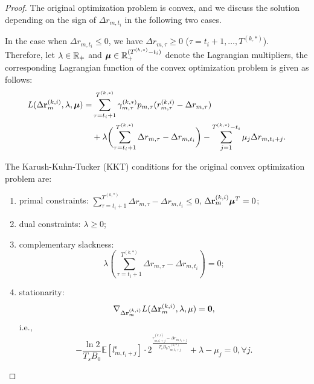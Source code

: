 \begin{proof}
    The original optimization problem is convex, and we discuss the solution depending on the sign of $\Delta{r}_{m,t_i}$ in the following two cases.

    In the case when $\Delta{r}_{m,t_i} \leq 0$, we have $\Delta{r}_{m,\tau} \geq 0$ ($\tau=t_i+1, \dots, T^{(k,*)}$).
    Therefore, let $\lambda \in \mathbb{R}_+$ and $\boldsymbol{\mu} \in \mathbb{R}^{(T^{(k,*)}-t_i)}_+$ denote the Lagrangian multipliers, the corresponding Lagrangian function of the convex optimization problem is given as follows:
    \begin{align*}
        L( \Delta{\slide{r}}^{(k,i)}_{m}, \lambda, \vecG{\mu} ) =
        &\sum_{\tau=t_i+1}^{T^{(k,*)}} \gamma^{(k,*)}_{m,\tau} p_{m,\tau}( r^{(k,i)}_{m,\tau} - \Delta{r}_{m,\tau} )
        \nonumber\\
        &+ \lambda \Paren{ \sum_{\tau=t_i+1}^{T^{(k,*)}} \Delta{r}_{m,\tau} - \Delta{r}_{m,t_i} }
        - \sum_{j=1}^{T^{(k,*)}-t_i} \mu_{j} \Delta{r}_{m,t_i+j}.
    \end{align*}

    The Karush-Kuhn-Tucker (KKT) conditions for the original convex optimization problem are:
    \begin{enumerate}
        \item primal constraints: $\sum_{\tau=t_i+1}^{T^{(k,*)}} \Delta{r}_{m,\tau} - \Delta{r}_{m,t_i} \leq 0$, $\Delta{{\mathbf{r}}}^{(k,i)}_{m} \boldsymbol{\mu}^T = 0$;
        \item dual constraints: $\lambda \geq 0$;
        \item complementary slackness:
        $$
        \lambda (\sum_{\tau=t_i+1}^{T^{(k,*)}} \Delta{r}_{m,\tau} - \Delta{r}_{m,t_i}) = 0;
        $$
        \item stationarity:
        $$
        \nabla_{\Delta{{\mathbf{r}}}^{(k,i)}_{m}} L( \Delta{{\mathbf{r}}}^{(k,i)}_{m}, \lambda, \mathbf{\mu} )
        = \mathbf{0},
        $$
        i.e.,
        $$
        - \frac{\ln{2}}{T_s B_0} \mathbb{E}[l^{\epsilon}_{m,t_i+j}] \cdot 2^{\frac{r^{(k,i)}_{m,t_i+j} - \Delta{r}_{m,t_i+j}}{T_s B_0 \gamma^{(k,*)}_{m,t_i+j}}} + \lambda - \mu_j = 0,
        \forall j.
        $$
    \end{enumerate}


\end{proof}

